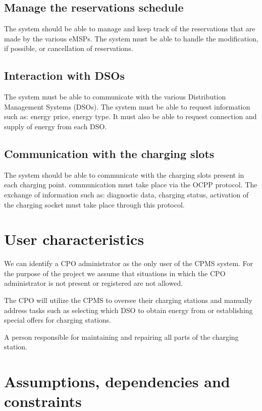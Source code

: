 \subsection{Manage the reservations schedule}
The system should be able to manage and keep track of the reservations that are made by the various eMSPs. The system must be able to handle the modification, if possible, or cancellation of reservations.

\subsection{Interaction with DSOs}
The system must be able to communicate with the various Distribution Management Systems (DSOs). The system must be able to request information such as: energy price, energy type. It must also be able to request connection and supply of energy from each DSO.

\subsection{Communication with the charging slots}
The system should be able to communicate with the charging slots present in each charging point. communication must take place via the OCPP protocol. The exchange of information such as: diagnostic data, charging status, activation of the charging socket must take place through this protocol.

\section{User characteristics}
We can identify a CPO administrator as the only user of the CPMS system. For the purpose of the project we assume that situations in which the CPO administrator is not present or registered are not allowed.

\begin{enumerate}
	The CPO will utilize the CPMS to oversee their charging stations and manually address tasks such as selecting which DSO to obtain energy from or establishing special offers for charging stations. 
	
	A person responsible for maintaining and repairing all parts of the charging station.
	
\end{enumerate}

\section{Assumptions, dependencies and constraints}

